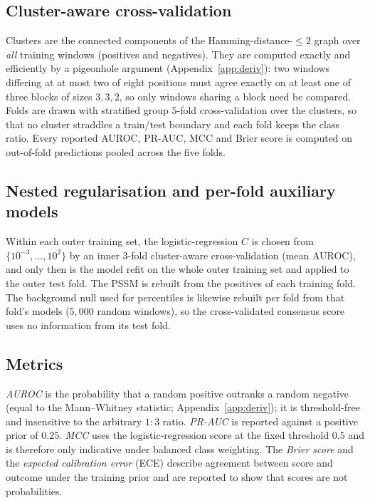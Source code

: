 \subsection{Cluster-aware cross-validation}
\label{sec:cv}
Clusters are the connected components of the Hamming-distance-$\le2$ graph over \emph{all} training windows (positives and negatives). They are computed exactly and efficiently by a pigeonhole argument (Appendix~\ref{app:deriv}): two windows differing at at most two of eight positions must agree exactly on at least one of three blocks of sizes $3,3,2$, so only windows sharing a block need be compared. Folds are drawn with stratified group $5$-fold cross-validation over the clusters, so that no cluster straddles a train/test boundary and each fold keeps the class ratio. Every reported AUROC, PR-AUC, MCC and Brier score is computed on out-of-fold predictions pooled across the five folds.

\subsection{Nested regularisation and per-fold auxiliary models}
Within each outer training set, the logistic-regression $C$ is chosen from $\{10^{-3},\dots,10^{2}\}$ by an inner $3$-fold cluster-aware cross-validation (mean AUROC), and only then is the model refit on the whole outer training set and applied to the outer test fold. The PSSM is rebuilt from the positives of each training fold. The background null used for percentiles is likewise rebuilt per fold from that fold's models ($5{,}000$ random windows), so the cross-validated consensus score uses no information from its test fold.

\subsection{Metrics}
\emph{AUROC} is the probability that a random positive outranks a random negative (equal to the Mann--Whitney statistic; Appendix~\ref{app:deriv}); it is threshold-free and insensitive to the arbitrary $1{:}3$ ratio. \emph{PR-AUC} is reported against a positive prior of $0.25$. \emph{MCC} uses the logistic-regression score at the fixed threshold $0.5$ and is therefore only indicative under balanced class weighting. The \emph{Brier score} and the \emph{expected calibration error} (ECE) describe agreement between score and outcome under the training prior and are reported to show that scores are not probabilities.

